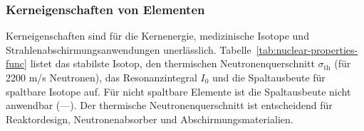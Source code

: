 \documentclass[12pt,a4paper]{article}
\begin{document}
	\subsubsection{Kerneigenschaften von Elementen}
	\label{subsec:nuclear-properties-func}
	
	Kerneigenschaften sind für die Kernenergie, medizinische Isotope und Strahlenabschirmungsanwendungen unerlässlich. Tabelle~\ref{tab:nuclear-properties-func} listet das stabilste Isotop, den thermischen Neutronenquerschnitt \(\sigma_{\text{th}}\) (für 2200 m/s Neutronen), das Resonanzintegral \(I_0\) und die Spaltausbeute für spaltbare Isotope auf. Für nicht spaltbare Elemente ist die Spaltausbeute nicht anwendbar (---). Der thermische Neutronenquerschnitt ist entscheidend für Reaktordesign, Neutronenabsorber und Abschirmungsmaterialien.
	
\end{document}
